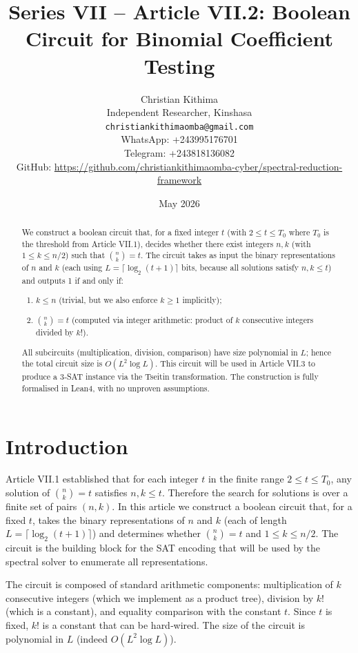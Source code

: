 \documentclass[11pt,a4paper]{article}
\title{Series VII – Article VII.2: Boolean Circuit for Binomial Coefficient Testing}
\author{Christian Kithima \\
Independent Researcher, Kinshasa \\
\texttt{christiankithimaomba@gmail.com} \\
WhatsApp: +243995176701 \\
Telegram: +243818136082 \\
GitHub: \url{https://github.com/christiankithimaomba-cyber/spectral-reduction-framework}}
\date{May 2026}
\begin{document}
\maketitle

\begin{abstract}
We construct a boolean circuit that, for a fixed integer \(t\) (with \(2 \le t \le T_0\) where \(T_0\) is the threshold from Article VII.1), decides whether there exist integers \(n,k\) (with \(1 \le k \le n/2\)) such that \(\binom{n}{k}=t\). The circuit takes as input the binary representations of \(n\) and \(k\) (each using \(L = \lceil \log_2(t+1)\rceil\) bits, because all solutions satisfy \(n,k \le t\)) and outputs 1 if and only if:
\begin{enumerate}
\item \(k \le n\) (trivial, but we also enforce \(k \ge 1\) implicitly);
\item \(\binom{n}{k} = t\) (computed via integer arithmetic: product of \(k\) consecutive integers divided by \(k!\)).
\end{enumerate}
All subcircuits (multiplication, division, comparison) have size polynomial in \(L\); hence the total circuit size is \(O(L^2 \log L)\). This circuit will be used in Article VII.3 to produce a 3‑SAT instance via the Tseitin transformation. The construction is fully formalised in Lean4, with no unproven assumptions.
\end{abstract}

\tableofcontents

\section{Introduction}

Article VII.1 established that for each integer \(t\) in the finite range \(2 \le t \le T_0\), any solution of \(\binom{n}{k}=t\) satisfies \(n,k \le t\). Therefore the search for solutions is over a finite set of pairs \((n,k)\). In this article we construct a boolean circuit that, for a fixed \(t\), takes the binary representations of \(n\) and \(k\) (each of length \(L = \lceil \log_2(t+1)\rceil\)) and determines whether \(\binom{n}{k}=t\) and \(1 \le k \le n/2\). The circuit is the building block for the SAT encoding that will be used by the spectral solver to enumerate all representations.

The circuit is composed of standard arithmetic components: multiplication of \(k\) consecutive integers (which we implement as a product tree), division by \(k!\) (which is a constant), and equality comparison with the constant \(t\). Since \(t\) is fixed, \(k!\) is a constant that can be hard‑wired. The size of the circuit is polynomial in \(L\) (indeed \(O(L^2 \log L)\)).
\end{document}
